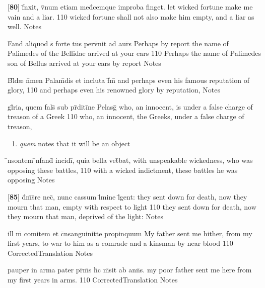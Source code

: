 \latline
  {[\textbf{80}] f\={\macron {\i}}nxit, v\={}num etiam med\={}cemque improba finget.}
  { let wicked fortune make me vain and a liar. }
  {110}
  { wicked fortune shall not also make him empty, and a liar as well. }
  { Notes }


\latline
  {Fand\={} aliquod s\={\macron {\i}} forte tu\={}s perv\={}nit ad aur\={\macron {\i}}s}
  { Perhaps by report the name of Palimedes of the Bellidae arrived at your ears }
  {110}
  { Perhaps the name of Palimedes son of Bellus arrived at your ears by report }
  { Notes }


\latline
  {B\={}l\={\macron {\i}}d{\ae} n\={}men Palam\={}dis et incluta f\={}m\={}}
  { and perhaps even his famous reputation of glory, }
  {110}
  { and perhaps even his renowned glory by reputation, }
  { Notes }


\latline
  {gl\={}ria, quem fals\={} sub pr\={}diti\={}ne Pelasg\={\macron {\i}}}
  { who, an innocent, is under a false charge of treason of a Greek }
  {110}
  { who, an innocent, the Greeks, under a false charge of treason, }
  { \begin{enumerate}
  	\item \emph{quem} notes that it will be an object
  \end{enumerate} }


\latline
  {\={\macron {\i}}nsontem \={\macron {\i}}nfand\={} incidi\={}, quia bella vet\={}bat,}
  { with unspeakable wickedness, who was opposing these battles, }
  {110}
  { with a wicked indictment, these battles he was opposing }
  { Notes }


\latline
  {[\textbf{85}] d\={}m\={\macron {\i}}s\={}re nec\={\macron {\i}}, nunc cassum l\={}mine l\={}gent:}
  { they sent down for death, now they mourn that man, empty with respect to light }
  {110}
  { they sent down for death, now they mourn that man, deprived of the light: }
  { Notes }


\latline
  {ill\={\macron {\i}} m\={} comitem et c\={}nsanguinit\={}te propinquum}
  { My father sent me hither, from my first years, to war to him as a comrade and a kinsman by near blood }
  {110}
  { CorrectedTranslation }
  { Notes }


\latline
  {pauper in arma pater pr\={\macron {\i}}m\={\macron {\i}}s h\={}c m\={\macron {\i}}sit ab ann\={\macron {\i}}s.}
  { my poor father sent me here from my first years in arms. }
  {110}
  { CorrectedTranslation }
  { Notes }


